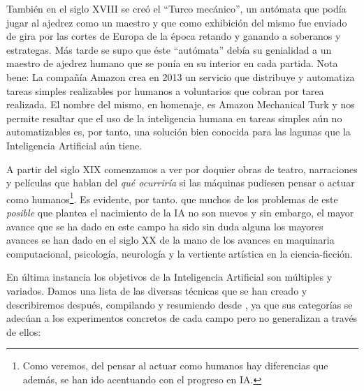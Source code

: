 \documentclass[12pt]{memoir}
\begin{document}
También en el siglo XVIII se creó el ``Turco mecánico'', un autómata que podía jugar al ajedrez como un maestro y que como exhibición del mismo fue enviado de gira por las cortes de Europa de la época retando y ganando a soberanos y estrategas. Más tarde se supo que éste ``autómata'' debía su genialidad a un maestro de ajedrez humano que se ponía en su interior en cada partida. Nota bene: La compañía Amazon crea en 2013 un servicio que distribuye y automatiza tareas simples realizables por humanos a voluntarios que cobran por tarea realizada. El nombre del mismo, en homenaje, es Amazon Mechanical Turk y nos permite resaltar que el uso de la inteligencia humana en tareas simples aún no automatizables es, por tanto, una solución bien conocida para las lagunas que la Inteligencia Artificial aún tiene. 

A partir del siglo XIX comenzamos a ver por doquier obras de teatro, narraciones y películas que hablan del \textit{qué ocurriría} si las máquinas pudiesen pensar o actuar como humanos\footnote{Como veremos, del pensar al actuar como humanos hay diferencias que además, se han ido acentuando con el progreso en IA.}. Es evidente, por tanto. que muchos de los problemas de este \textit{posible} que plantea el nacimiento de la IA no son nuevos y sin embargo, el mayor avance que se ha dado en este campo ha sido sin duda alguna los mayores avances se han dado en el siglo XX de la mano de los avances en maquinaria computacional, psicología, neurología y la vertiente artística en la ciencia-ficción.

En última instancia los objetivos de la Inteligencia Artificial son múltiples y variados. Damos una lista de las diversas técnicas que se han creado y describiremos después, compilando y resumiendo desde \cite{mcarthy2007}, ya que sus categorías se adecúan a los experimentos concretos de cada campo pero no generalizan a través de ellos:
\end{document}
